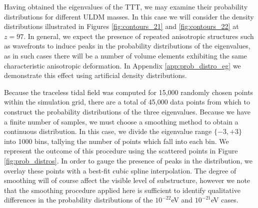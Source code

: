 \documentclass[a4paper,11pt]{article}
\begin{document}
Having obtained the eigenvalues of the TTT, we may examine their probability distributions for different ULDM masses. In this case we will consider the density distributions illustrated in Figures \ref{fig:contours_21} and \ref{fig:contours_22} at $z=97$. In general, we expect the presence of repeated anisotropic structures such as wavefronts to induce peaks in the probability distributions of the eigenvalues, as in such cases there will be a number of volume elements exhibiting the same characteristic anisotropic deformation. In Appendix \ref{app:prob_distro_eg} we demonstrate this effect using artificial density distributions. 

Because the traceless tidal field was computed for 15,000 randomly chosen points within the simulation grid, there are a total of 45,000 data points from which to construct the probability distributions of the three eigenvalues. Because we have a finite number of samples, we must choose a smoothing method to obtain a continuous distribution. In this case, we divide the eigenvalue range $\{-3,+3\}$ into 1000 bins, tallying the number of points which fall into each bin. We represent the outcome of this procedure using the scattered points in Figure \ref{fig:prob_distros}. In order to gauge the presence of peaks in the distribution, we overlay these points with a best-fit cubic spline interpolation. The degree of smoothing will of course affect the visible level of substructure, however we note that the smoothing procedure applied here is sufficient to identify qualitative differences in the probability distributions of the $10^{-22}$eV and $10^{-21}$eV cases. 
\end{document}
